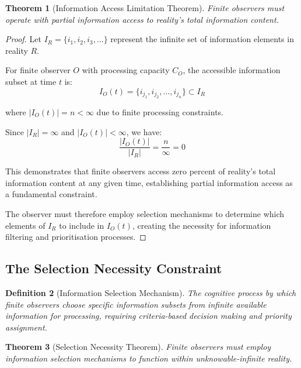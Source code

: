 \documentclass[12pt,a4paper]{article}
\newtheorem{theorem}{Theorem}[section]
\newtheorem{definition}[theorem]{Definition}
\begin{document}
\begin{theorem}[Information Access Limitation Theorem]
Finite observers must operate with partial information access to reality's total information content.
\end{theorem}

\begin{proof}
Let $I_R = \{i_1, i_2, i_3, ...\}$ represent the infinite set of information elements in reality $R$.

For finite observer $O$ with processing capacity $C_O$, the accessible information subset at time $t$ is:
$$I_O(t) = \{i_{j_1}, i_{j_2}, ..., i_{j_n}\} \subset I_R$$

where $|I_O(t)| = n < \infty$ due to finite processing constraints.

Since $|I_R| = \infty$ and $|I_O(t)| < \infty$, we have:
$$\frac{|I_O(t)|}{|I_R|} = \frac{n}{\infty} = 0$$

This demonstrates that finite observers access zero percent of reality's total information content at any given time, establishing partial information access as a fundamental constraint.

The observer must therefore employ selection mechanisms to determine which elements of $I_R$ to include in $I_O(t)$, creating the necessity for information filtering and prioritisation processes.
\end{proof}

\subsection{The Selection Necessity Constraint}

\begin{definition}[Information Selection Mechanism]
The cognitive process by which finite observers choose specific information subsets from infinite available information for processing, requiring criteria-based decision making and priority assignment.
\end{definition}

\begin{theorem}[Selection Necessity Theorem]
Finite observers must employ information selection mechanisms to function within unknowable-infinite reality.
\end{theorem}
\end{document}
